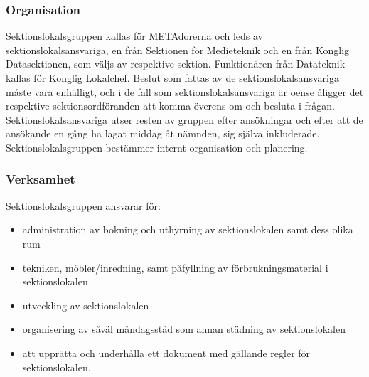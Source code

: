 \documentclass{dgovdoc}
\begin{document}
\subsubsection{Organisation}

Sektionslokalsgruppen kallas för METAdorerna och leds av sektionslokalsansvariga, en från Sektionen för
Medieteknik och en från Konglig Datasektionen, som väljs av respektive sektion.
Funktionären från Datateknik kallas för Konglig Lokalchef. Beslut som fattas av de sektionslokalsansvariga måste vara enhälligt, och i de
fall som sektionslokalsansvariga är oense åligger det respektive
sektionsordföranden att komma överens om och besluta i frågan.
Sektionslokalsansvariga utser resten av gruppen efter ansökningar och efter att
de ansökande en gång ha lagat middag åt nämnden, sig själva inkluderade.
Sektionslokalsgruppen bestämmer internt organisation och planering.

\subsubsection{Verksamhet}

Sektionslokalsgruppen ansvarar för:

\begin{itemize}
  \item administration av bokning och uthyrning av sektionslokalen samt dess
    olika rum
\end{itemize}

\begin{itemize}
  \item tekniken, möbler/inredning, samt påfyllning av förbrukningsmaterial i
    sektionslokalen
\end{itemize}

\begin{itemize}
  \item utveckling av sektionslokalen
\end{itemize}

\begin{itemize}
  \item organisering av såväl måndagsstäd som annan städning av
sektionslokalen
\end{itemize}

\begin{itemize}
  \item att upprätta och underhålla ett dokument med gällande regler för
    sektionslokalen.
\end{itemize}
\end{document}
